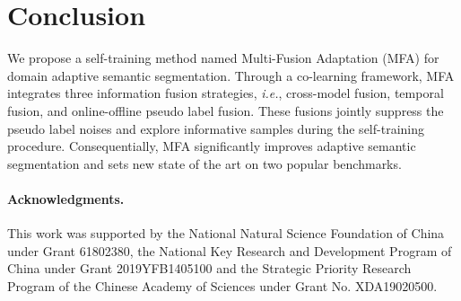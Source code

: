 \documentclass{bmvc2k}
\begin{document}
\section{Conclusion}
We propose a self-training method named Multi-Fusion Adaptation (MFA) for domain adaptive semantic segmentation. Through a co-learning framework, MFA integrates three information fusion strategies, \emph{i.e.}, cross-model fusion, temporal fusion, and online-offline pseudo label fusion. These fusions jointly suppress the pseudo label noises and explore informative samples during the self-training procedure. Consequentially, MFA significantly improves adaptive semantic segmentation and sets new state of the art on two popular benchmarks. 

\paragraph{Acknowledgments.}
This work was supported by the National Natural Science Foundation of China under Grant 61802380, the National Key Research and Development Program of China under Grant 2019YFB1405100 and the Strategic Priority Research Program of the Chinese Academy of Sciences under Grant No. XDA19020500.

\end{document}

